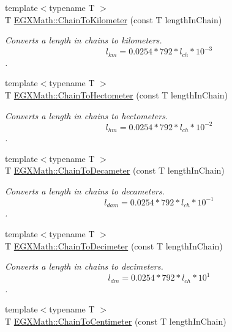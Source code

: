 \begin{DoxyCompactItemize}
{\footnotesize template$<$typename T $>$ }\\T \mbox{\hyperlink{group___e_g_x_math-_conversions-_length_conversions-_imperial-_chain-_s_i_ga4fd4349867e45ce387c01403b8dcf426}{E\+G\+X\+Math\+::\+Chain\+To\+Kilometer}} (const T length\+In\+Chain)
\begin{DoxyCompactList}\small\item\em Converts a length in chains to kilometers. \[ l_{km}=0.0254 * 792 * l_{ch} * 10^{-3} \]. \end{DoxyCompactList}\item 
{\footnotesize template$<$typename T $>$ }\\T \mbox{\hyperlink{group___e_g_x_math-_conversions-_length_conversions-_imperial-_chain-_s_i_ga306a29ba8425ed22c19171e718d42f20}{E\+G\+X\+Math\+::\+Chain\+To\+Hectometer}} (const T length\+In\+Chain)
\begin{DoxyCompactList}\small\item\em Converts a length in chains to hectometers. \[ l_{hm}=0.0254 * 792 * l_{ch} * 10^{-2} \]. \end{DoxyCompactList}\item 
{\footnotesize template$<$typename T $>$ }\\T \mbox{\hyperlink{group___e_g_x_math-_conversions-_length_conversions-_imperial-_chain-_s_i_gaabde0350f3af15795de0adeac2ec9e28}{E\+G\+X\+Math\+::\+Chain\+To\+Decameter}} (const T length\+In\+Chain)
\begin{DoxyCompactList}\small\item\em Converts a length in chains to decameters. \[ l_{dam}=0.0254 * 792 * l_{ch} * 10^{-1} \]. \end{DoxyCompactList}\item 
{\footnotesize template$<$typename T $>$ }\\T \mbox{\hyperlink{group___e_g_x_math-_conversions-_length_conversions-_imperial-_chain-_s_i_ga9311e5452f0bd1f79f95e43085ad6412}{E\+G\+X\+Math\+::\+Chain\+To\+Decimeter}} (const T length\+In\+Chain)
\begin{DoxyCompactList}\small\item\em Converts a length in chains to decimeters. \[ l_{dm}=0.0254 * 792 * l_{ch} * 10^{1} \]. \end{DoxyCompactList}\item 
{\footnotesize template$<$typename T $>$ }\\T \mbox{\hyperlink{group___e_g_x_math-_conversions-_length_conversions-_imperial-_chain-_s_i_ga33a053c1566c1371a9ac3a5ce66340bf}{E\+G\+X\+Math\+::\+Chain\+To\+Centimeter}} (const T length\+In\+Chain)

\end{DoxyCompactItemize}
